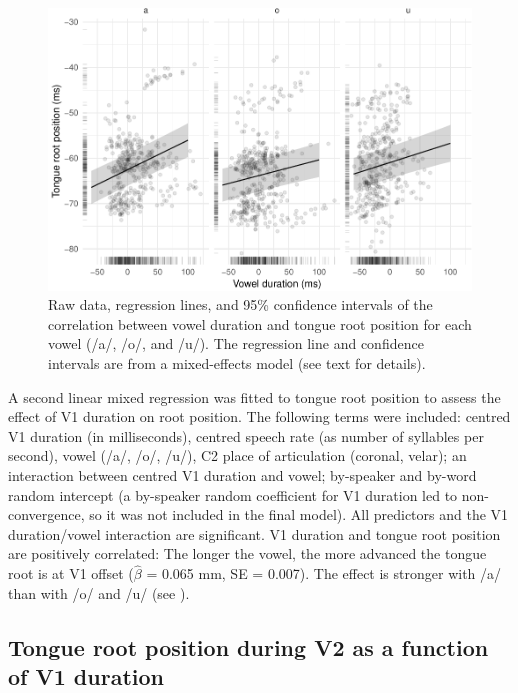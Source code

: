 \documentclass[12pt,]{article}
\begin{document}
\label{s:trp-vdur}

\begin{figure}
\includegraphics[width=\linewidth]{2018-tra_files/figure-latex/tra-lm-2-plot-1} \caption{Raw data, regression lines, and 95\% confidence intervals of the correlation between vowel duration and tongue root position for each vowel (/a/, /o/, and /u/). The regression line and confidence intervals are from a mixed-effects model (see text for details).}\label{f:tra-lm-2-plot}
\end{figure}

A second linear mixed regression was fitted to tongue root position to
assess the effect of V1 duration on root position. The following terms
were included: centred V1 duration (in milliseconds), centred speech
rate (as number of syllables per second), vowel (/a/, /o/, /u/), C2
place of articulation (coronal, velar); an interaction between centred
V1 duration and vowel; by-speaker and by-word random intercept (a
by-speaker random coefficient for V1 duration led to non-convergence, so
it was not included in the final model). All predictors and the V1
duration/vowel interaction are significant. V1 duration and tongue root
position are positively correlated: The longer the vowel, the more
advanced the tongue root is at V1 offset (\(\hat{\beta}\) = 0.065 mm, SE
= 0.007). The effect is stronger with /a/ than with /o/ and /u/ (see
).

\hypertarget{tongue-root-position-during-v2-as-a-function-of-v1-duration}{%
\subsection{Tongue root position during V2 as a function of V1
duration}\label{tongue-root-position-during-v2-as-a-function-of-v1-duration}}
\end{document}
